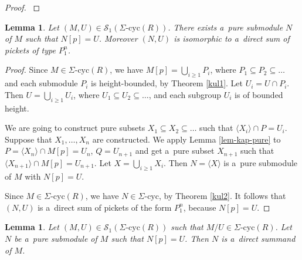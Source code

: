 \documentclass[twoside,leqno,12pt]{amsart}
\def\SigCyc{\mbox{$\Sigma$-cyc}}
\newtheorem{lem}[thm]{Lemma}
\theoremstyle{definition}
\theoremstyle{remark}
\numberwithin{equation}{section}
\begin{document}
\begin{proof}
 \cite[Theorem 8.5]{kt}
\end{proof}

\begin{lem}
  Let $(M,U)\in\mathcal{S}_1(\SigCyc(R))$. There exists a~pure submodule $N$ of $M$ such that $N[p]=U$.
  Moreover $(N,U)$ is isomorphic to a~direct sum of pickets of type $P_1^n$.
\label{NpU}
\end{lem}

\begin{proof}
Since $M\in\SigCyc(R)$, we have  $M[p]=\bigcup_{i\geq 1}P_i$, where $P_1\subseteq P_2\subseteq \ldots $ and each submodule $P_i$ is height-bounded, by Theorem \ref{kul1}. Let $U_i=U\cap P_i$. Then $U=\bigcup_{i\geq 1}U_i$, where $U_1\subseteq U_2\subseteq\ldots $, and each subgroup $U_i$ is of bounded height.

We are going to construct pure subsets
$X_1\subseteq X_2\subseteq\ldots$ such that $\langle X_i\rangle\cap P=U_i$.
Suppose that $X_1,\ldots, X_n$ are constructed.
We apply Lemma \ref{lem-kap-pure} to $P=\langle X_n\rangle\cap M[p]=U_n$,
$Q=U_{n+1}$ and get a~pure subset $X_{n+1}$ such that $\langle X_{n+1}\rangle\cap M[p]=U_{n+1}$.
Let $X=\bigcup_{i\geq 1}X_i$. Then $N=\langle X\rangle$ is a~pure submodule of $M$ with $N[p]=U$.

Since $M\in\SigCyc(R)$, we have $N\in\SigCyc$, by Theorem \ref{kul2}. It follows that $(N,U)$ is a~direct sum of pickets of the form $P_1^n$, because $N[p]=U$.
\end{proof}

\begin{lem}\label{lem-directsummand}
  Let $(M,U)\in\mathcal{S}_1(\SigCyc(R))$ such that $M/U\in\SigCyc(R)$.
  Let $N$ be a~pure submodule of $M$ such that $N[p]=U$. Then $N$ is a~direct summand of $M$.
\end{lem}
\end{document}
